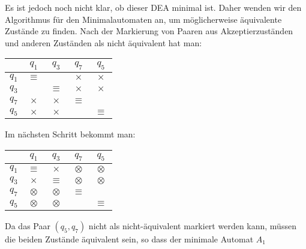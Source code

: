 \begin{loesung}
\begin{teilaufgaben}
Es ist jedoch noch nicht klar, ob dieser DEA minimal ist. Daher wenden
wir den Algorithmus für den Minimalautomaten an, um möglicherweise
äquivalente Zustände zu finden. Nach der Markierung von Paaren aus
Akzeptierzuständen und anderen Zuständen als nicht äquivalent hat man:
\begin{center}
\begin{tabular}{|c|cccc|}
\hline
     &$q_1$   &$q_3$   &$q_7$   &$q_5$\\
\hline
$q_1$&$\equiv$&        &$\times$&$\times$\\
$q_3$&        &$\equiv$&$\times$&$\times$\\
$q_7$&$\times$&$\times$&$\equiv$&        \\
$q_5$&$\times$&$\times$&        &$\equiv$\\
\hline
\end{tabular}
\end{center}
Im nächsten Schritt bekommt man:
\begin{center}
\begin{tabular}{|c|cccc|}
\hline
     &$q_1$    &$q_3$    &$q_7$    &$q_5$\\
\hline
$q_1$&$\equiv$ &$\times$ &$\otimes$&$\otimes$\\
$q_3$&$\times$ &$\equiv$ &$\otimes$&$\otimes$\\
$q_7$&$\otimes$&$\otimes$&$\equiv$ &        \\
$q_5$&$\otimes$&$\otimes$&         &$\equiv$\\
\hline
\end{tabular}
\end{center}
Da das Paar $(q_5,q_7)$  nicht als nicht-äquivalent
markiert werden kann, müssen die beiden Zustände äquivalent sein,
so dass der minimale Automat $A_1$
\begin{center}
\end{center}
\end{teilaufgaben}
\end{loesung}
